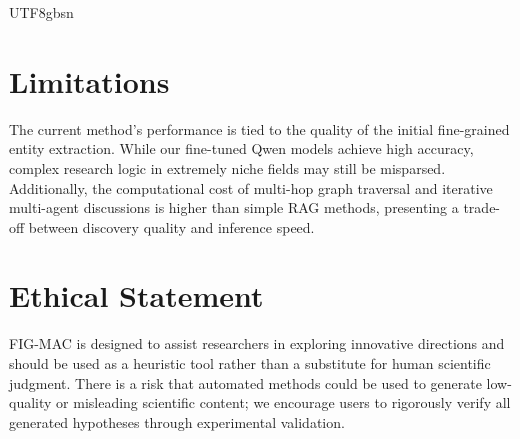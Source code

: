 \documentclass[11pt]{article}
\begin{document}
\begin{CJK}{UTF8}{gbsn}
\section*{Limitations}
The current method's performance is tied to the quality of the initial fine-grained entity extraction. While our fine-tuned Qwen models achieve high accuracy, complex research logic in extremely niche fields may still be misparsed. Additionally, the computational cost of multi-hop graph traversal and iterative multi-agent discussions is higher than simple RAG methods, presenting a trade-off between discovery quality and inference speed.

\section*{Ethical Statement}
FIG-MAC is designed to assist researchers in exploring innovative directions and should be used as a heuristic tool rather than a substitute for human scientific judgment. There is a risk that automated methods could be used to generate low-quality or misleading scientific content; we encourage users to rigorously verify all generated hypotheses through experimental validation.






\end{CJK}
\end{document}
